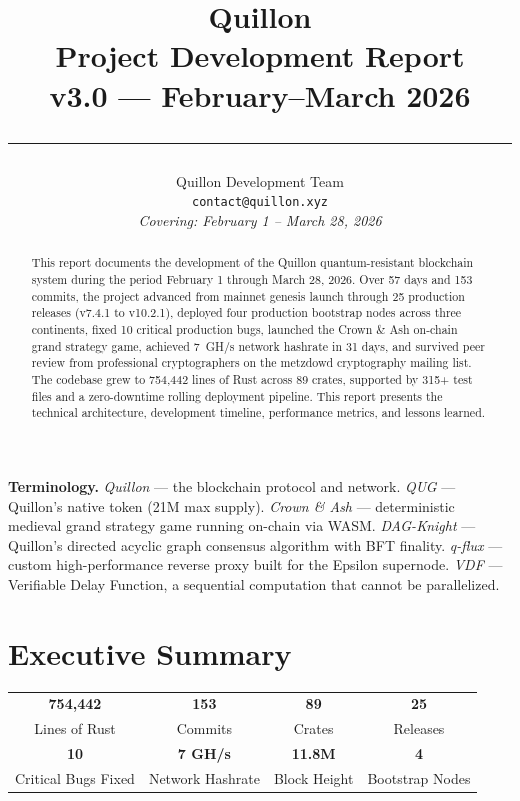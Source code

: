 \documentclass[11pt,a4paper]{article}
\title{%
\vspace{-1cm}
{\Huge\bfseries\textcolor{qblue}{Quillon}}\\[0.3cm]
{\LARGE\textcolor{qdark}{Project Development Report}}\\[0.2cm]
{\Large v3.0 --- February--March 2026}\\[0.5cm]
\textcolor{qgold}{\rule{0.6\textwidth}{1.5pt}}
}
\author{%
Quillon Development Team\\
\texttt{contact@quillon.xyz}\\[0.3cm]
\textit{Covering: February 1 -- March 28, 2026}
}
\date{}
\begin{document}
\maketitle
\thispagestyle{fancy}

\begin{abstract}
\noindent
This report documents the development of the Quillon quantum-resistant blockchain system during the period February 1 through March 28, 2026. Over 57 days and 153 commits, the project advanced from mainnet genesis launch through 25 production releases (v7.4.1 to v10.2.1), deployed four production bootstrap nodes across three continents, fixed 10 critical production bugs, launched the Crown \& Ash on-chain grand strategy game, achieved 7~GH/s network hashrate in 31 days, and survived peer review from professional cryptographers on the metzdowd cryptography mailing list. The codebase grew to 754,442 lines of Rust across 89 crates, supported by 315+ test files and a zero-downtime rolling deployment pipeline. This report presents the technical architecture, development timeline, performance metrics, and lessons learned.
\end{abstract}

\vspace{0.3cm}
\noindent\textbf{Terminology.}
\textit{Quillon} --- the blockchain protocol and network.
\textit{QUG} --- Quillon's native token (21M max supply).
\textit{Crown \& Ash} --- deterministic medieval grand strategy game running on-chain via WASM.
\textit{DAG-Knight} --- Quillon's directed acyclic graph consensus algorithm with BFT finality.
\textit{q-flux} --- custom high-performance reverse proxy built for the Epsilon supernode.
\textit{VDF} --- Verifiable Delay Function, a sequential computation that cannot be parallelized.

\tableofcontents
\newpage

\section{Executive Summary}

\begin{metricbox}
\centering
\begin{tabular}{cccc}
\textbf{\textcolor{qblue}{\Large 754,442}} & \textbf{\textcolor{qgreen}{\Large 153}} & \textbf{\textcolor{qpurple}{\Large 89}} & \textbf{\textcolor{qorange}{\Large 25}} \\
Lines of Rust & Commits & Crates & Releases \\[0.3cm]
\textbf{\textcolor{qred}{\Large 10}} & \textbf{\textcolor{qteal}{\Large 7 GH/s}} & \textbf{\textcolor{qgold}{\Large 11.8M}} & \textbf{\textcolor{qblue}{\Large 4}} \\
Critical Bugs Fixed & Network Hashrate & Block Height & Bootstrap Nodes \\
\end{tabular}
\end{metricbox}
\end{document}
